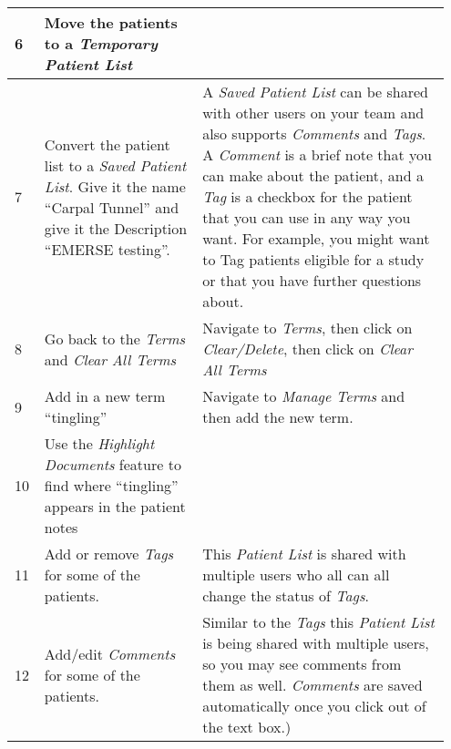 \begin{center}
\begin{longtable}{|p{0.05\linewidth}|p{0.35\linewidth}|p{0.55\linewidth}|}
    \hline
    6 & Move the patients to a \textit{Temporary Patient List} &  \\
    \hline
    7 & Convert the patient list to a \textit{Saved Patient List}. Give it the name “Carpal Tunnel” and give it the Description “EMERSE testing”. & A \textit{Saved Patient List} can be shared with other users on your team and also supports \textit{Comments} and \textit{Tags}. A \textit{Comment} is a brief note that you can make about the patient, and a \textit{Tag} is a checkbox for the patient that you can use in any way you want. For example, you might want to Tag patients eligible for a study or that you have further questions about. \\
    \hline
    8 & Go back to the \textit{Terms} and \textit{Clear All Terms} & Navigate to \textit{Terms}, then click on \textit{Clear/Delete}, then click on \textit{Clear All Terms} \\
    \hline
    9 & Add in a new term “tingling” & Navigate to \textit{Manage Terms} and then add the new term. \\
    \hline
    10 & Use the \textit{Highlight Documents} feature to find where “tingling” appears in the patient notes &  \\
    \hline
    11 & Add or remove \textit{Tags} for some of the patients. & This \textit{Patient List} is shared with multiple users who all can all change the status of \textit{Tags}. \\
    \hline
    12 & Add/edit \textit{Comments} for some of the patients. & Similar to the \textit{Tags} this \textit{Patient List} is being shared with multiple users, so you may see comments from them as well. \textit{Comments} are saved automatically once you click out of the text box.) \\
    \end{longtable}
    \label{tab:scenario_2}
\end{center}

